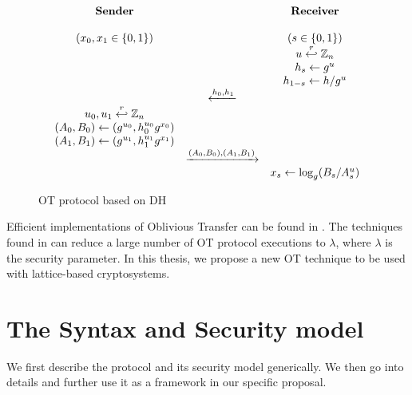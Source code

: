 \begin{figure}[h!]
  \centering
  \begin{equation*}
    \begin{array}{c c c}
      \text{\textbf{Sender}} & & \text{\textbf{Receiver}} \\
      \\
      (x_{0}, x_{1} \in \{0,1\}) & & (s \in \{0,1\}) \\
                             & & u \stackrel{r}{\hookleftarrow} \mathbb{Z}_{n}\\
                             & & h_{s} \gets g^{u}\\
                             & & h_{1-s} \gets h/g^{u}\\
                             & \xleftarrow{h_{0}, h_{1}} & \\
      u_{0}, u_{1} \stackrel{r}{\hookleftarrow} \mathbb{Z}_{n} & & \\
      (A_{0}, B_{0}) \gets (g^{u_{0}}, h_{0}^{u_{0}}g^{x_{0}}) & & \\
      (A_{1}, B_{1}) \gets (g^{u_{1}}, h_{1}^{u_{1}}g^{x_{1}}) & & \\
                             & \xrightarrow{(A_{0}, B_{0}),(A_{1}, B_{1})} & \\
      & & x_{s} \gets \log_{g}(B_{s}/A_{s}^{u})
    \end{array}
  \end{equation*}
  \caption{OT protocol based on DH}
  \label{fig:DH21OT}
\end{figure}

Efficient implementations of Oblivious Transfer can be found in \cite{naor2001efficient35}. The techniques found in \cite{ishai2003extending24} can reduce a large number of OT protocol executions to \(\lambda\), where \(\lambda\) is the security parameter. In this thesis, we propose a new OT technique to be used with lattice-based cryptosystems.

\section{The Syntax and Security model}
\label{sec:syntaxModel}
We first describe the protocol and its security model generically.  We then go into details and further use it as a framework in our specific proposal.

